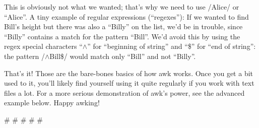 \documentclass[12pt]{article}
\begin{document}
\ttfamily
\colorbox{black}{}
\normalfont

This is obviously not what we wanted; that's why we need to use /Alice/ or ``Alice''. A tiny example of regular expressions (``regexes''): If we wanted to find Bill's height but there was also a ``Billy'' on the list, we'd be in trouble, since ``Billy'' contains a match for the pattern ``Bill''. We'd avoid this by using the regex special characters ``$\wedge$'' for ``beginning of string'' and ``\$'' for ``end of string'': the pattern /$\wedge$Bill\$/ would match only ``Bill'' and not ``Billy''.


That's it! Those are the bare-bones basics of how awk works. Once you get a bit used to it, you'll likely find yourself using it quite regularly if you work with text files a lot. For a more serious demonstration of awk's power, see the advanced example below. Happy awking!



\# \# \# \# \#

\pagebreak
\end{document}
